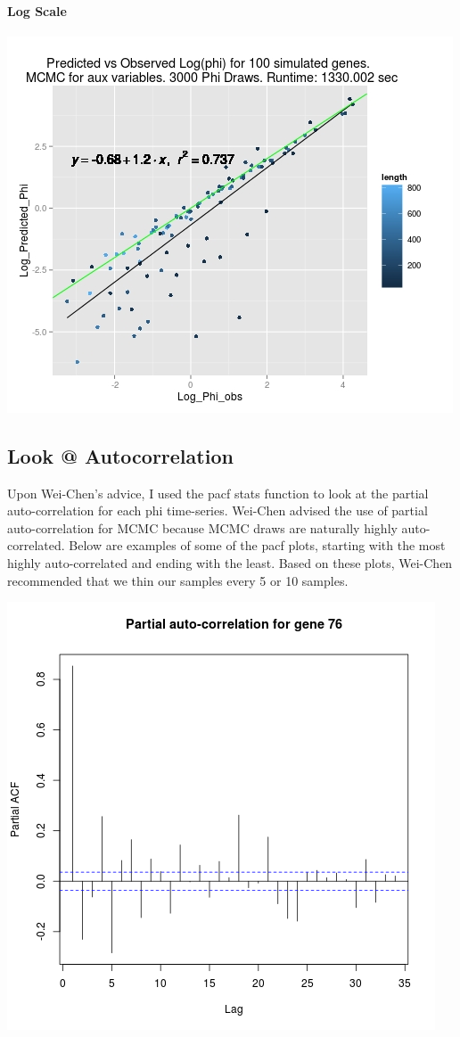 \documentclass{article}
\begin{document}
	 	\paragraph{Log Scale}
		\includegraphics[scale=0.5]{../chosen_100/3000_steps/BIS10/Rplot02.jpeg}	 
 
 \subsection{Look @ Autocorrelation}

	Upon Wei-Chen's advice, I used the pacf {stats} function to look at the partial auto-correlation for each phi time-series. Wei-Chen advised the use of partial auto-correlation for MCMC because MCMC draws are naturally highly auto-correlated. Below are examples of some of the pacf plots, starting with the most highly auto-correlated and ending with the least. Based on these plots, Wei-Chen recommended that we thin our samples every 5 or 10 samples. 
	
	\includegraphics[scale=0.5]{../chosen_100/3000_steps/BIS10/pacf/76_pacf.png}
	
\end{document}
